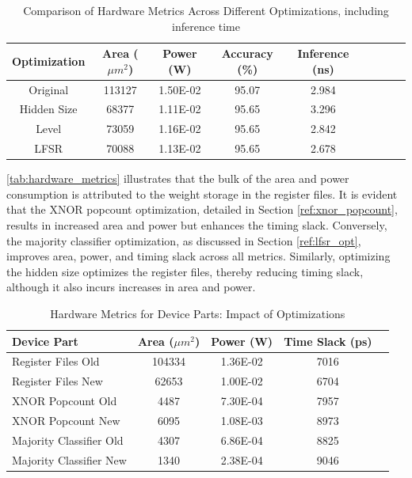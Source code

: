 \documentclass[conference]{IEEEtran}
\newcounter{todocount}
\newcommand{\todo}[1]{
  \stepcounter{todocount}
}
\begin{document}
\todo{power to joules}

\begin{table}[h]
    \centering
    \caption{Comparison of Hardware Metrics Across Different Optimizations, including inference time}
    \label{tab:optimization_metrics}
    \begin{tabular}{@{}ccccccccc@{}}
        \toprule
        \textbf{Optimization} & \textbf{Area ($\mu m^2$)} & \textbf{Power (W)} & \textbf{Accuracy (\%)} & \textbf{Inference (ns)}  \\
        \midrule
        Original & 113127 & 1.50E-02 & 95.07 & 2.984 \\
        Hidden Size & 68377 & 1.11E-02 & 95.65 & 3.296 \\
        Level & 73059 & 1.16E-02 & 95.65 & 2.842 \\
        LFSR & 70088 & 1.13E-02 & 95.65 & 2.678 \\
        \bottomrule
    \end{tabular}
\end{table}

\autoref{tab:hardware_metrics} illustrates that the bulk of the area and power consumption is attributed to the weight storage in the register files. It is evident that the XNOR popcount optimization, detailed in Section \ref{ref:xnor_popcount}, results in increased area and power but enhances the timing slack. Conversely, the majority classifier optimization, as discussed in Section \ref{ref:lfsr_opt}, improves area, power, and timing slack across all metrics. Similarly, optimizing the hidden size optimizes the register files, thereby reducing timing slack, although it also incurs increases in area and power.

\begin{table}[h]
    \centering
    \caption{Hardware Metrics for Device Parts: Impact of Optimizations}
    \label{tab:hardware_metrics}
    \begin{tabular}{@{}lcccc@{}}
        \toprule
        \textbf{Device Part} & \textbf{Area (\(\mu m^2\))} & \textbf{Power (W)} & \textbf{Time Slack (ps)} \\
        \midrule
        Register Files Old & 104334 & 1.36E-02 & 7016 \\
        Register Files New & 62653 & 1.00E-02 & 6704 \\
        XNOR Popcount Old & 4487 & 7.30E-04 & 7957 \\
        XNOR Popcount New & 6095 & 1.08E-03 & 8973 \\
        Majority Classifier Old & 4307 & 6.86E-04 & 8825 \\
        Majority Classifier New & 1340 & 2.38E-04 & 9046 \\
        \bottomrule
    \end{tabular}
\end{table}
\end{document}
